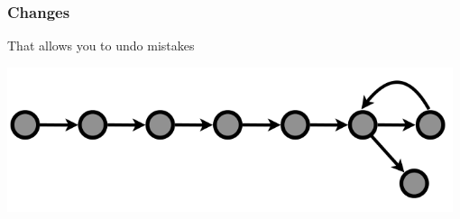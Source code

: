   \begin{frame}[t]
    \frametitle{Changes}
    That allows you to undo mistakes
    \begin{center}
      \includegraphics[width=0.98\textwidth]{../images/from-wickham-06.png} 
    \end{center} 
  \end{frame}
